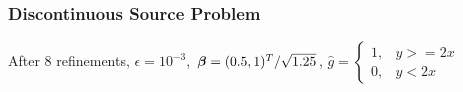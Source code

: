 \documentclass{beamer}
\begin{document}
\begin{frame}
\frametitle{Discontinuous Source Problem}
After 8 refinements, $\epsilon=10^{-3}$,
$\boldsymbol\beta=(0.5,1)^T/\sqrt{1.25}$, $\hat g=
\begin{cases}
1, & y >=2x\\
0, & y <2x
\end{cases}$
\end{frame}
\end{document}
